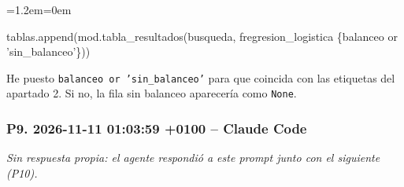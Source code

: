 \documentclass[11pt,a4paper]{article}
\newenvironment{codigo}
  {\par\smallskip\begin{list}{}{\leftmargin=1.2em\rightmargin=0em}\item\relax\ttfamily\scriptsize\raggedright}
  {\end{list}\smallskip}
\begin{document}
{\begin{codigo}
tablas.append(mod.tabla\_\allowbreak{}resultados(busqueda, f\textquotedbl{}regresion\_\allowbreak{}logistica \textbar{} \{balanceo or 'sin\_\allowbreak{}balanceo'\}\textquotedbl{}))
\end{codigo}
He puesto \texttt{balanceo or 'sin\_\allowbreak{}balanceo'} para que coincida con las etiquetas del apartado 2. Si no, la fila sin balanceo aparecería como \texttt{None}.

}

\subsubsection*{P9. 2026-11-11 01:03:59 +0100 -- Claude Code}
\textit{Sin respuesta propia: el agente respondió a este prompt junto con el siguiente (P10).}
\end{document}
